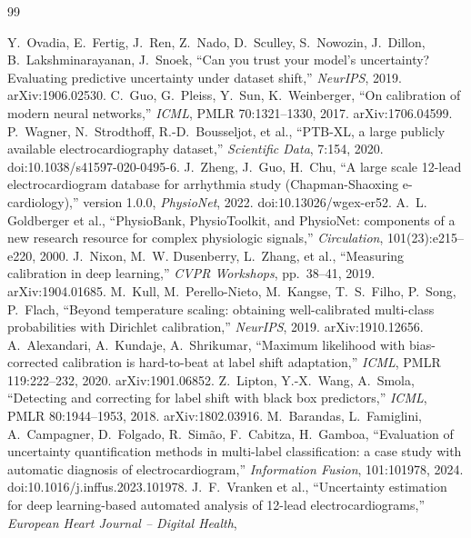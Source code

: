 \documentclass[review,12pt,nonatbib]{elsarticle}
\begin{document}
\begin{thebibliography}{99}
\raggedright
 Y.~Ovadia, E.~Fertig, J.~Ren, Z.~Nado,
D.~Sculley, S.~Nowozin, J.~Dillon, B.~Lakshminarayanan, J.~Snoek,
``Can you trust your model's uncertainty? Evaluating predictive
uncertainty under dataset shift,'' \emph{NeurIPS}, 2019.
arXiv:1906.02530.
 C.~Guo, G.~Pleiss, Y.~Sun, K.~Weinberger,
``On calibration of modern neural networks,'' \emph{ICML}, PMLR
70:1321--1330, 2017. arXiv:1706.04599.
 P.~Wagner, N.~Strodthoff, R.-D.~Bousseljot,
et al., ``PTB-XL, a large publicly available electrocardiography
dataset,'' \emph{Scientific Data}, 7:154, 2020.
doi:10.1038/s41597-020-0495-6.
 J.~Zheng, J.~Guo, H.~Chu,
``A large scale 12-lead electrocardiogram database for arrhythmia
study (Chapman-Shaoxing e-cardiology),'' version 1.0.0,
\emph{PhysioNet}, 2022. doi:10.13026/wgex-er52.
 A.~L. Goldberger et al., ``PhysioBank,
PhysioToolkit, and PhysioNet: components of a new research resource
for complex physiologic signals,'' \emph{Circulation},
101(23):e215--e220, 2000.
 J.~Nixon, M.~W. Dusenberry, L.~Zhang, et al.,
``Measuring calibration in deep learning,'' \emph{CVPR Workshops},
pp.~38--41, 2019. arXiv:1904.01685.
 M.~Kull, M.~Perello-Nieto, M.~Kangse,
T.~S.~Filho, P.~Song, P.~Flach, ``Beyond temperature scaling:
obtaining well-calibrated multi-class probabilities with Dirichlet
calibration,'' \emph{NeurIPS}, 2019. arXiv:1910.12656.
 A.~Alexandari, A.~Kundaje, A.~Shrikumar,
``Maximum likelihood with bias-corrected calibration is hard-to-beat
at label shift adaptation,'' \emph{ICML}, PMLR 119:222--232, 2020.
arXiv:1901.06852.
 Z.~Lipton, Y.-X.~Wang, A.~Smola,
``Detecting and correcting for label shift with black box
predictors,'' \emph{ICML}, PMLR 80:1944--1953, 2018.
arXiv:1802.03916.
 M.~Barandas, L.~Famiglini, A.~Campagner,
D.~Folgado, R.~Sim\~ao, F.~Cabitza, H.~Gamboa, ``Evaluation of
uncertainty quantification methods in multi-label classification: a
case study with automatic diagnosis of electrocardiogram,''
\emph{Information Fusion}, 101:101978, 2024.
doi:10.1016/j.inffus.2023.101978.
 J.~F.~Vranken et al., ``Uncertainty estimation for
deep learning-based automated analysis of 12-lead
electrocardiograms,'' \emph{European Heart Journal -- Digital Health},

\end{thebibliography}
\end{document}
